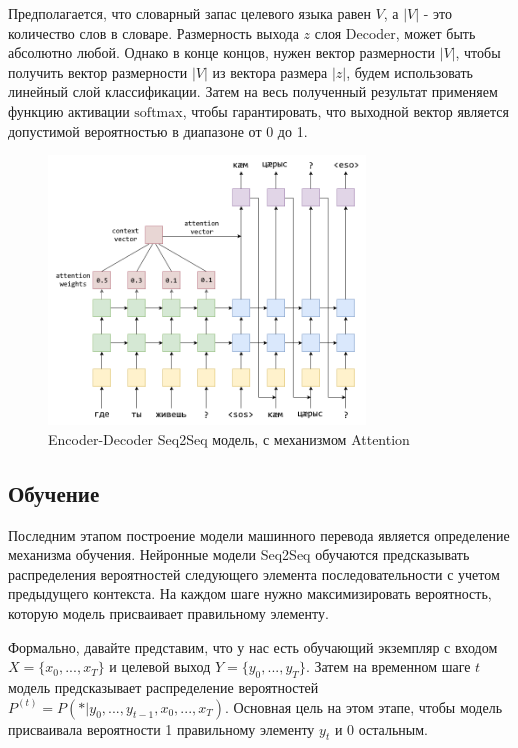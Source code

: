 	Предполагается, что словарный запас целевого языка равен $V$, а $|V|$ - это количество слов в словаре. Размерность выхода $z$ слоя Decoder, может быть абсолютно любой. Однако в конце концов, нужен вектор размерности $|V|$, чтобы получить вектор размерности $|V|$ из вектора размера $|z|$, будем использовать линейный слой классификации. Затем на весь полученный результат применяем функцию активации $\text{softmax}$, чтобы гарантировать, что выходной вектор является допустимой вероятностью в диапазоне от 0 до 1.
	
	\clearpage
	
	\begin{figure}[ht!]
		\centering
		\captionsetup{justification=centering}
		\includegraphics[width=0.75\textwidth]{img/Model.png}
		\caption{Encoder-Decoder Seq2Seq модель, с механизмом Attention}
	\end{figure}
	
	\subsection{Обучение}
	
	Последним этапом построение модели машинного перевода является определение механизма обучения. Нейронные модели Seq2Seq обучаются предсказывать распределения вероятностей следующего элемента последовательности с учетом предыдущего контекста. На каждом шаге нужно максимизировать вероятность, которую модель присваивает правильному элементу. 
	
	Формально, давайте представим, что у нас есть обучающий экземпляр с входом  $X = \{ x_0, ... , x_T \}$ и целевой выход $Y = \{ y_0, ... , y_T \}$. Затем на временном шаге $t$ модель предсказывает распределение вероятностей $P^{(t)} = P(*|y_0, ..., y_{t - 1}, x_0, ..., x_{T})$. Основная цель на этом этапе, чтобы модель присваивала вероятности 1 правильному элементу $y_t$ и 0 остальным.
	
